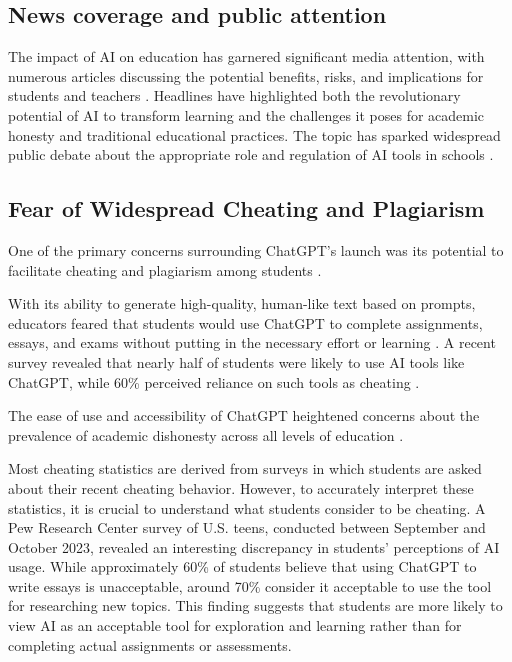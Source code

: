\documentclass{article}
\begin{document}
\subsection{News coverage and public attention}
The impact of AI on education has garnered significant media attention,
with numerous articles discussing the potential benefits, risks,
and implications for students and teachers
\cite{bbc2023ai_education} \cite{tampabay2024ai_education} \cite{theweek2024ai_schools}.
Headlines have highlighted both the revolutionary potential of AI
to transform learning and the challenges it poses for academic
honesty and traditional educational practices. The topic has
sparked widespread public debate about the appropriate role and
regulation of AI tools in schools
\cite{tampabay2024ai_education}
\cite{theweek2024ai_schools}.

\subsection{Fear of Widespread Cheating and Plagiarism}
One of the primary concerns surrounding ChatGPT's launch
was its potential to facilitate cheating and plagiarism among students
\cite{missouri2023chatgpt} \cite{shiri2023chatgpt} \cite{reddit_chatgpt_academic_purposes}.


With its ability to generate high-quality, human-like text
based on prompts, educators feared that students would use
ChatGPT to complete assignments, essays, and exams without
putting in the necessary effort or learning
\cite{missouri2023chatgpt} \cite{reddit_chatgpt_academic_purposes}
\cite{theweek_ai_schools}.
A recent survey revealed that nearly half of students were likely
to use AI tools like ChatGPT, while 60\% perceived reliance on
such tools as cheating \cite{missouri2023chatgpt} .

The ease of use and accessibility of ChatGPT heightened concerns
about the prevalence of academic dishonesty across all levels of
education \cite{shiri2023chatgpt}\cite{reddit_chatgpt_academic_purposes}.

Most cheating statistics are derived from surveys in which students
are asked about their recent cheating behavior.
However, to accurately interpret these statistics, it is crucial
to understand what students consider to be cheating.
A Pew Research Center survey of U.S. teens, conducted between
September and October 2023, revealed an interesting discrepancy
in students' perceptions of AI usage. While approximately 60\%
of students believe that using ChatGPT to write essays is unacceptable, around 70\%
consider it acceptable to use the tool for researching new topics.
This finding suggests that students are more likely to view AI
as an acceptable tool for exploration and learning rather than for
completing actual assignments or assessments.
\end{document}

